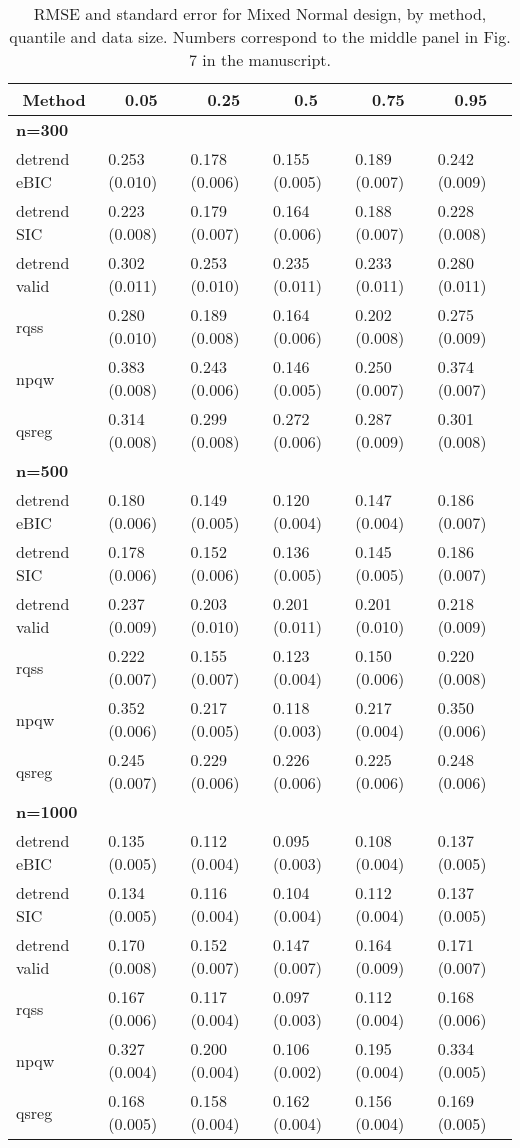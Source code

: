 \documentclass[12pt]{article}
\numberwithin{equation}{section}
\theoremstyle{plain}
\begin{document}
\begin{table}[!tbp]
\begin{center}
	\caption{RMSE and standard error for Mixed Normal design, by method, quantile and data size. Numbers correspond to the middle panel in Fig. 7 in the manuscript.}
\begin{tabular}{llllll}
\hline\hline
\multicolumn{1}{c}{Method}&\multicolumn{1}{c}{0.05}&\multicolumn{1}{c}{0.25}&\multicolumn{1}{c}{0.5}&\multicolumn{1}{c}{0.75}&\multicolumn{1}{c}{0.95}\tabularnewline
\hline
{\bfseries n=300}&&&&&\tabularnewline
detrend eBIC&0.253 (0.010)&0.178 (0.006)&0.155 (0.005)&0.189 (0.007)&0.242 (0.009)\tabularnewline
detrend SIC&0.223 (0.008)&0.179 (0.007)&0.164 (0.006)&0.188 (0.007)&0.228 (0.008)\tabularnewline
detrend valid&0.302 (0.011)&0.253 (0.010)&0.235 (0.011)&0.233 (0.011)&0.280 (0.011)\tabularnewline
rqss&0.280 (0.010)&0.189 (0.008)&0.164 (0.006)&0.202 (0.008)&0.275 (0.009)\tabularnewline
npqw&0.383 (0.008)&0.243 (0.006)&0.146 (0.005)&0.250 (0.007)&0.374 (0.007)\tabularnewline
qsreg&0.314 (0.008)&0.299 (0.008)&0.272 (0.006)&0.287 (0.009)&0.301 (0.008)\tabularnewline
\hline
{\bfseries n=500}&&&&&\tabularnewline
detrend eBIC&0.180 (0.006)&0.149 (0.005)&0.120 (0.004)&0.147 (0.004)&0.186 (0.007)\tabularnewline
detrend SIC&0.178 (0.006)&0.152 (0.006)&0.136 (0.005)&0.145 (0.005)&0.186 (0.007)\tabularnewline
detrend valid&0.237 (0.009)&0.203 (0.010)&0.201 (0.011)&0.201 (0.010)&0.218 (0.009)\tabularnewline
rqss&0.222 (0.007)&0.155 (0.007)&0.123 (0.004)&0.150 (0.006)&0.220 (0.008)\tabularnewline
npqw&0.352 (0.006)&0.217 (0.005)&0.118 (0.003)&0.217 (0.004)&0.350 (0.006)\tabularnewline
qsreg&0.245 (0.007)&0.229 (0.006)&0.226 (0.006)&0.225 (0.006)&0.248 (0.006)\tabularnewline
\hline
{\bfseries n=1000}&&&&&\tabularnewline
detrend eBIC&0.135 (0.005)&0.112 (0.004)&0.095 (0.003)&0.108 (0.004)&0.137 (0.005)\tabularnewline
detrend SIC&0.134 (0.005)&0.116 (0.004)&0.104 (0.004)&0.112 (0.004)&0.137 (0.005)\tabularnewline
detrend valid&0.170 (0.008)&0.152 (0.007)&0.147 (0.007)&0.164 (0.009)&0.171 (0.007)\tabularnewline
rqss&0.167 (0.006)&0.117 (0.004)&0.097 (0.003)&0.112 (0.004)&0.168 (0.006)\tabularnewline
npqw&0.327 (0.004)&0.200 (0.004)&0.106 (0.002)&0.195 (0.004)&0.334 (0.005)\tabularnewline
qsreg&0.168 (0.005)&0.158 (0.004)&0.162 (0.004)&0.156 (0.004)&0.169 (0.005)\tabularnewline
\hline
\end{tabular}\end{center}
\end{table}
\end{document}
